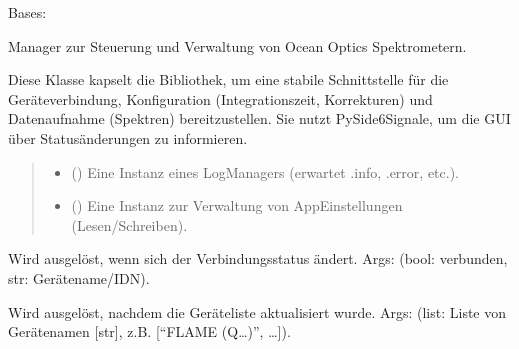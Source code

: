 \documentclass[letterpaper,10pt,english]{sphinxmanual}
\begin{document}
\begin{fulllineitems}
\label{\detokenize{modulab/spectrometer_manager:modules.spectrometer.SpectrometerManager.SpectrometerManager}}
\pysigstartsignatures
\pysiglinewithargsret
{}
{\sphinxparamcomma {}}
{}
\pysigstopsignatures
\sphinxAtStartPar
Bases: 

\sphinxAtStartPar
Manager zur Steuerung und Verwaltung von Ocean Optics Spektrometern.

\sphinxAtStartPar
Diese Klasse kapselt die \sphinxhyphen{}Bibliothek, um eine stabile
Schnittstelle für die Geräteverbindung, Konfiguration (Integrationszeit,
Korrekturen) und Datenaufnahme (Spektren) bereitzustellen.
Sie nutzt PySide6\sphinxhyphen{}Signale, um die GUI über Statusänderungen zu informieren.
\begin{quote}\begin{description}
\begin{itemize}
\item {} 
\sphinxAtStartPar
{} () \textendash{} Eine Instanz eines Log\sphinxhyphen{}Managers (erwartet .info, .error, etc.).

\item {} 
\sphinxAtStartPar
{} () \textendash{} Eine Instanz zur Verwaltung von
App\sphinxhyphen{}Einstellungen (Lesen/Schreiben).

\end{itemize}

\end{description}\end{quote}
\begin{description}
\begin{description}
\sphinxAtStartPar
Wird ausgelöst, wenn sich der Verbindungsstatus ändert.
Args: (bool: verbunden, str: Gerätename/IDN).

\sphinxAtStartPar
Wird ausgelöst, nachdem die Geräteliste aktualisiert wurde.
Args: (list: Liste von Gerätenamen {[}str{]}, z.B. {[}“FLAME (Q…)”, …{]}).


\end{description}
\end{description}
\end{fulllineitems}
\end{document}
